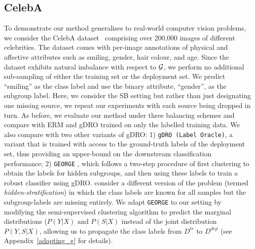 
\subsection{CelebA}\label{ssec:celeba_exp}
%

%
To demonstrate our method generalises to real-world computer vision problems, we consider the
CelebA dataset~\cite{liu2015celeba} comprising over 200,000 images of different celebrities. The
dataset comes with per-image annotations of physical and affective attributes such as smiling,
gender, hair colour, and age.
%
Since the dataset exhibits natural imbalance with respect to ${\mathcal{G}}$, we perform no additional
sub-sampling of either the training set or the deployment set. We predict ``smiling'' as the class
label and use the binary attribute, ``gender'', as the subgroup label. Here, we consider the SB
setting but rather than just designating one missing source, we repeat our experiments with each
source being dropped in turn.
%
As before, we evaluate our method under three balancing schemes and compare with ERM and gDRO
trained on only the labelled training data.
%
We also compare with two other variants of gDRO: 1) \texttt{gDRO (Label Oracle)}, a variant that is
trained with access to the ground-truth labels of the deployment set, thus providing an upper-bound
on the downstream classification performance; 2) \texttt{GEORGE} \citep{SohDunAngGuetal20}, which
follows a two-step procedure of first clustering to obtain the labels for hidden subgroups, and
then using these labels to train a robust classifier using gDRO.
%
\citet{SohDunAngGuetal20} consider a different version of the problem (termed
\emph{hidden-stratification}) in which the class labels are known for all samples but the
subgroup-labels are missing entirely.
%
We adapt \texttt{GEORGE} to our setting by modifying the semi-supervised clustering algorithm to
predict the marginal distributions (\(P(Y|X)\) and \(P(S|X)\) instead of the joint distribution
\(P(Y, S|X)\), allowing us to propagate the class labels from \( D^{tr} \) to \( D^{dep} \) (see
Appendix~\ref{adapting_g} for details).


